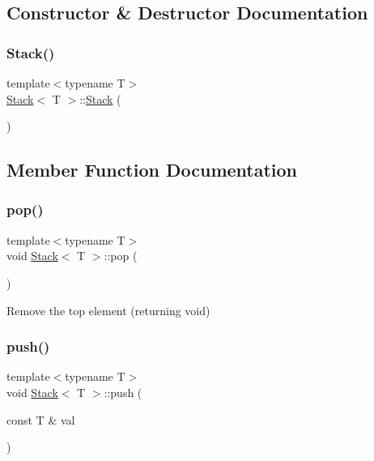 \subsection{Constructor \& Destructor Documentation}
\mbox{\label{class_stack_aefee698059467258bbd79045aca62a63}} 
\subsubsection{\texorpdfstring{Stack()}{Stack()}}
{\footnotesize\ttfamily template$<$typename T$>$ \\
\hyperlink{class_stack}{Stack}$<$ T $>$\+::\hyperlink{class_stack}{Stack} (\begin{DoxyParamCaption}{ }\end{DoxyParamCaption})\hspace{0.3cm}{\ttfamily [inline]}}



\subsection{Member Function Documentation}
\mbox{\label{class_stack_a2723aec5c7e2611b97fcffeb7709de33}} 
\subsubsection{\texorpdfstring{pop()}{pop()}}
{\footnotesize\ttfamily template$<$typename T$>$ \\
void \hyperlink{class_stack}{Stack}$<$ T $>$\+::pop (\begin{DoxyParamCaption}{ }\end{DoxyParamCaption})\hspace{0.3cm}{\ttfamily [inline]}}

Remove the top element (returning void)\mbox{\label{class_stack_a6e8312460808f468b004d709d3308757}} 
\subsubsection{\texorpdfstring{push()}{push()}}
{\footnotesize\ttfamily template$<$typename T$>$ \\
void \hyperlink{class_stack}{Stack}$<$ T $>$\+::push (\begin{DoxyParamCaption}\item[{const T \&}]{val }\end{DoxyParamCaption})\hspace{0.3cm}{\ttfamily [inline]}}

